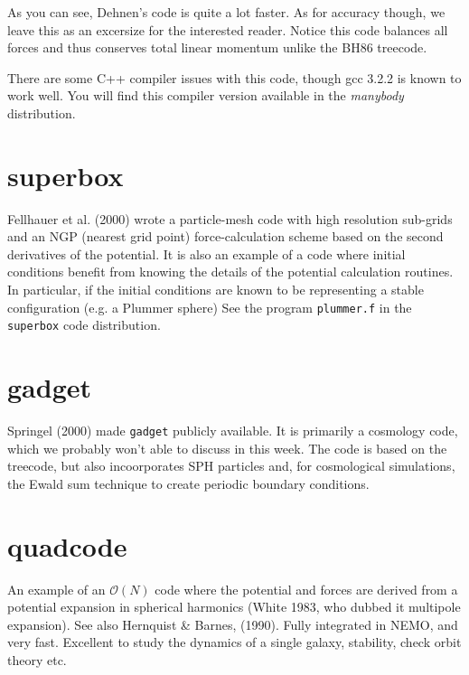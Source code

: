 As you can see, Dehnen's code is quite a lot faster. As for accuracy though, we leave
this as an excersize for the interested reader. Notice this code balances all forces
and thus conserves total linear momentum unlike the BH86 treecode.

\smallskip
There are some C++
compiler issues with this code, though  gcc 3.2.2 is known to work well. You will
find this compiler version available in the {\it manybody} distribution.

\section{superbox}

Fellhauer et al. (2000) wrote a particle-mesh code with high resolution
sub-grids and an NGP (nearest grid point) force-calculation scheme
based on the second derivatives of the potential.  It is also an example of 
a code where initial conditions benefit from knowing the details of the
potential calculation routines. In particular, if the initial conditions
are known to be representing a stable configuration (e.g. a Plummer sphere)
See the program {\tt plummer.f} in the {\tt superbox} code distribution.

\section{gadget}

Springel (2000) made {\tt gadget} publicly available.
It is primarily a cosmology code, which we probably won't able to discuss in this
week. The code is based on the treecode, but also incoorporates SPH particles
and, for cosmological simulations, the Ewald sum technique to create periodic
boundary conditions.


\section{quadcode}


An example of an $\mathcal{O}(N)$ code where the potential and forces are derived from
a potential expansion in spherical harmonics  (White 1983, who dubbed it multipole expansion). 
See also Hernquist \& Barnes, (1990). Fully integrated
in NEMO, and very fast. Excellent to study the dynamics of a single galaxy,
stability, check orbit theory etc.

